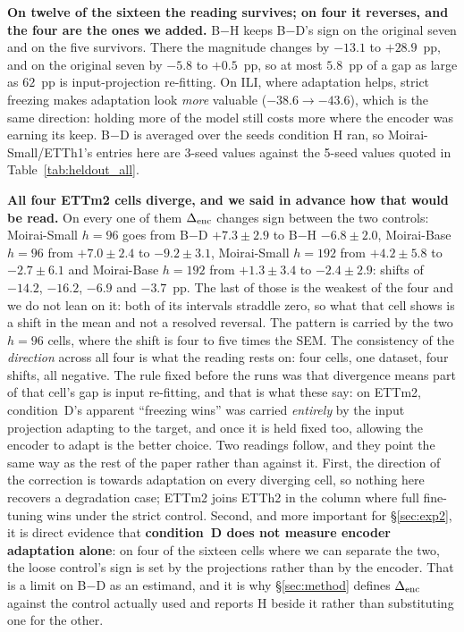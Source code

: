 \textbf{On twelve of the sixteen the reading survives; on four it reverses, and
the four are the ones we added.} B$-$H keeps B$-$D's sign on the original seven
and on the five survivors. There the magnitude
changes by $-13.1$ to $+28.9$~pp, and on the original seven by $-5.8$ to
$+0.5$~pp, so at most $5.8$~pp of a gap as large as
$62$~pp is input-projection re-fitting. On ILI, where adaptation helps, strict
freezing makes adaptation look \emph{more} valuable ($-38.6 \to -43.6$), which
is the same direction: holding more of the model still costs more where the
encoder was earning its keep. B$-$D is averaged over the seeds condition H
ran, so Moirai-Small/ETTh1's entries here are 3-seed values against the 5-seed
values quoted in Table~\ref{tab:heldout_all}.

\textbf{All four ETTm2 cells diverge, and we said in advance how that would be
read.} On every one of them $\Delta_\text{enc}$ changes sign between the two controls:
Moirai-Small $h{=}96$ goes from B$-$D $+7.3{\pm}2.9$ to B$-$H $-6.8{\pm}2.0$,
Moirai-Base $h{=}96$ from $+7.0{\pm}2.4$ to $-9.2{\pm}3.1$, Moirai-Small
$h{=}192$ from $+4.2{\pm}5.8$ to $-2.7{\pm}6.1$ and Moirai-Base $h{=}192$ from
$+1.3{\pm}3.4$ to $-2.4{\pm}2.9$: shifts of $-14.2$, $-16.2$, $-6.9$ and
$-3.7$~pp. The last of those is the weakest of the four and we do not lean on it:
both of its intervals straddle zero, so what that cell shows is a shift in the
mean and not a resolved reversal. The pattern is carried by the two $h{=}96$
cells, where the shift is four to five times the SEM. The consistency of the
\emph{direction} across all four is what the reading rests on: four cells, one
dataset, four shifts, all negative. The rule fixed before the runs was that divergence means part of
that cell's gap is input re-fitting, and that is what these say: on ETTm2,
condition~D's apparent ``freezing wins'' was carried \emph{entirely} by the
input projection adapting to the target, and once it is held fixed too,
allowing the encoder to adapt is the better choice. Two readings follow, and
they point the same way as the rest of the paper rather than against it. First,
the direction of the correction is towards adaptation on every diverging cell,
so nothing here recovers a degradation case; ETTm2 joins ETTh2 in the column
where full fine-tuning wins under the strict control. Second, and more
important for \S\ref{sec:exp2}, it is direct evidence that
\textbf{condition~D does not measure encoder adaptation alone}: on four of the
sixteen cells where we can separate the two, the loose control's sign is set by
the projections rather than by the encoder. That is a limit on B$-$D as an
estimand, and it is why \S\ref{sec:method} defines $\Delta_\text{enc}$ against the control
actually used and reports H beside it rather than substituting one for the
other.

